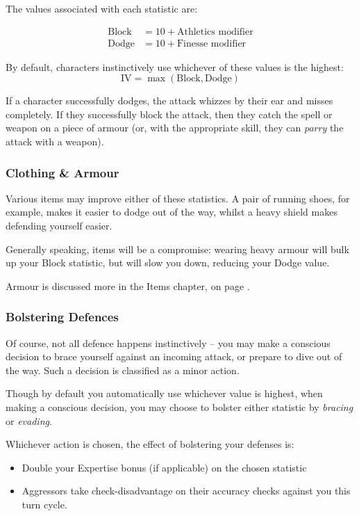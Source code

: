 The values associated with each statistic are:

\begin{align*} 
\text{Block} &= 10 + \text{Athletics modifier} 
\\
\text{Dodge} &= 10 + \text{Finesse modifier} 
\end{align*}

By default, characters instinctively use whichever of these values is the highest:
$$ \text{IV} = \max \left( \text{Block}, \text{Dodge} \right)$$

If a character successfully dodges, the attack whizzes by their ear and misses completely. If they successfully block the attack, then they catch the spell or weapon on a piece of armour (or, with the appropriate skill, they can {\it parry} the attack with a weapon). 

\subsubsection{Clothing \& Armour}

Various items may improve either of these statistics. A pair of running shoes, for example, makes it easier to dodge out of the way, whilst a heavy shield makes defending yourself easier. 

Generally speaking, items will be a compromise: wearing heavy armour will bulk up your Block statistic, but will slow you down, reducing your Dodge value. 

Armour is discussed more in the Items chapter, on page \pageref{S:Armour}.

\subsubsection{Bolstering Defences }

Of course, not all defence happens instinctively -- you may make a conscious decision to brace yourself against an incoming attack, or prepare to dive out of the way. Such a decision is classified as a minor action. 

Though by default you automatically use whichever value is highest, when making a conscious decision, you may choose to bolster either statistic by {\it bracing} or {\it evading}. 

Whichever action is chosen, the effect of bolstering your defenses is:
\begin{itemize}
\item Double your Expertise bonus (if applicable) on the chosen statistic 
\item Aggressors take check-disadvantage on their accuracy checks against you this turn cycle. 
\end{itemize}


